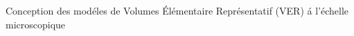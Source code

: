 \documentclass[final]{beamer}
\begin{document}
\begin{frame}
\begin{center}
\begin{minipage}{\textwidth}
\begin{exampleblock}{\rule[-0.6ex]{0pt}{50pt}\centering\LARGE Conception des mod\'eles de Volumes \'El\'ementaire Repr\'esentatif (VER) \'a l'\'echelle microscopique}
\begin{columns}
\begin{column}{0.3\textwidth}
\begin{center}
\end{center}
\end{column}
\begin{column}{0.15\textwidth}  %
    \begin{center}
\captionsetup[subfigure]{labelformat=empty}
\begin{figure}[!h]
\centering
{}
\end{figure}
     \end{center}
\end{column}
\begin{column}{0.125\textwidth}

\end{column}
\end{columns}
\end{exampleblock}
\end{minipage}
\end{center}
\end{frame}
\end{document}
